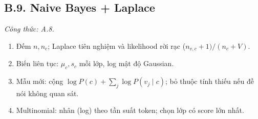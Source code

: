 \subsection*{B.9. Naive Bayes + Laplace}
\textit{Công thức: A.8.}
\begin{enumerate}
  \item Đếm \(n,n_c\); Laplace tiên nghiệm và likelihood rời rạc (\(n_{v,c}+1)/(n_c+V)\).
  \item Biến liên tục: \(\mu_c,s_c\) mỗi lớp, log mật độ Gaussian.
  \item Mẫu mới: cộng \(\log P(c)+\sum_j\log P(v_j\mid c)\); bỏ thuộc tính thiếu nếu đề nói không quan sát.
  \item Multinomial: nhân (log) theo tần suất token; chọn lớp có score lớn nhất.
\end{enumerate}
